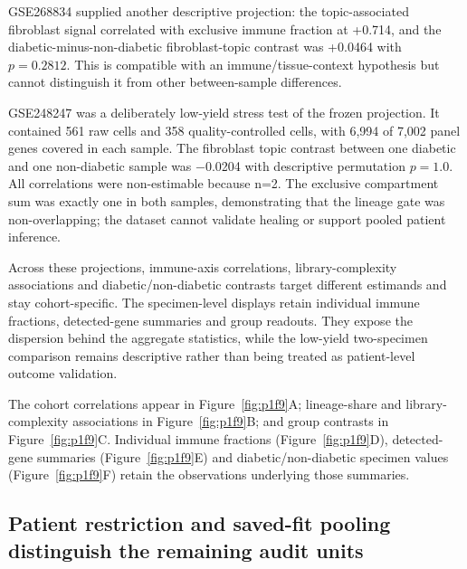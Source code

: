 \documentclass[10pt,a4paper]{article}
\begin{document}
GSE268834 supplied another descriptive projection: the topic-associated fibroblast signal correlated with exclusive immune fraction at +0.714, and the diabetic-minus-non-diabetic fibroblast-topic contrast was +0.0464 with $p=0.2812$. This is compatible with an immune/tissue-context hypothesis but cannot distinguish it from other between-sample differences.

GSE248247 was a deliberately low-yield stress test of the frozen projection. It contained 561 raw cells and 358 quality-controlled cells, with 6,994 of 7,002 panel genes covered in each sample. The fibroblast topic contrast between one diabetic and one non-diabetic sample was −0.0204 with descriptive permutation $p=1.0$. All correlations were non-estimable because n=2. The exclusive compartment sum was exactly one in both samples, demonstrating that the lineage gate was non-overlapping; the dataset cannot validate healing or support pooled patient inference.

Across these projections, immune-axis correlations, library-complexity associations and diabetic/non-diabetic contrasts target different estimands and stay cohort-specific. The specimen-level displays retain individual immune fractions, detected-gene summaries and group readouts. They expose the dispersion behind the aggregate statistics, while the low-yield two-specimen comparison remains descriptive rather than being treated as patient-level outcome validation.

The cohort correlations appear in Figure~\ref{fig:p1f9}A\label{call:p1f9}; lineage-share and library-complexity associations in Figure~\ref{fig:p1f9}B; and group contrasts in Figure~\ref{fig:p1f9}C. Individual immune fractions (Figure~\ref{fig:p1f9}D), detected-gene summaries (Figure~\ref{fig:p1f9}E) and diabetic/non-diabetic specimen values (Figure~\ref{fig:p1f9}F) retain the observations underlying those summaries.




\subsection{Patient restriction and saved-fit pooling distinguish the remaining audit units}
\end{document}
